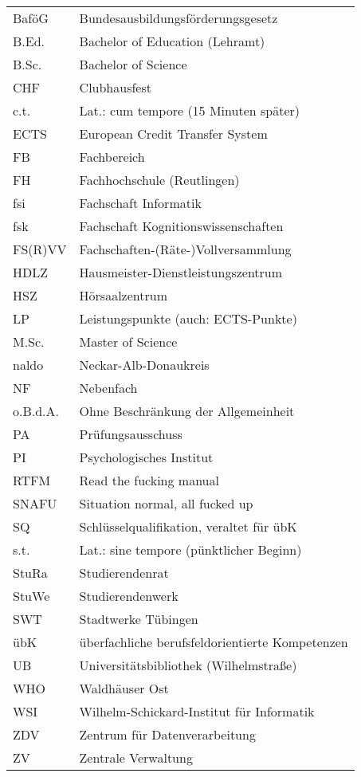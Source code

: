 \renewcommand{\arraystretch}{1.2}
\begin{tabular}{ll}
BaföG    & Bundesausbildungsförderungsgesetz \\
B.Ed.	 & Bachelor of Education (Lehramt) \\
B.Sc.    & Bachelor of Science \\
CHF      & Clubhausfest \\
c.t.     & Lat.: cum tempore (15 Minuten später) \\
ECTS     & European Credit Transfer System \\
FB       & Fachbereich \\
FH       & Fachhochschule (Reutlingen) \\
fsi      & Fachschaft Informatik \\
fsk      & Fachschaft Kognitionswissenschaften \\
FS(R)VV  & Fachschaften-(Räte-)Vollversammlung \\
HDLZ     & Hausmeister-Dienstleistungszentrum \\
HSZ      & Hörsaalzentrum \\
LP       & Leistungspunkte (auch: ECTS-Punkte) \\
M.Sc.    & Master of Science \\
naldo    & Neckar-Alb-Donaukreis\\
NF       & Nebenfach \\
o.B.d.A. & Ohne Beschränkung der Allgemeinheit \\
PA       & Prüfungsausschuss \\
PI       & Psychologisches Institut \\
RTFM     & Read the fucking manual \\
SNAFU    & Situation normal, all fucked up \\
SQ       & Schlüsselqualifikation, veraltet für übK\\
s.t.     & Lat.: sine tempore (pünktlicher Beginn) \\
StuRa    & Studierendenrat \\
StuWe    & Studierendenwerk \\
SWT      & Stadtwerke Tübingen \\
übK      & überfachliche berufsfeldorientierte Kompetenzen \\
UB       & Universitätsbibliothek (Wilhelmstraße) \\
WHO      & Waldhäuser Ost \\
WSI      & Wilhelm-Schickard-Institut für Informatik \\
ZDV      & Zentrum für Datenverarbeitung \\
ZV       & Zentrale Verwaltung\\
\end{tabular}
\vfill %
